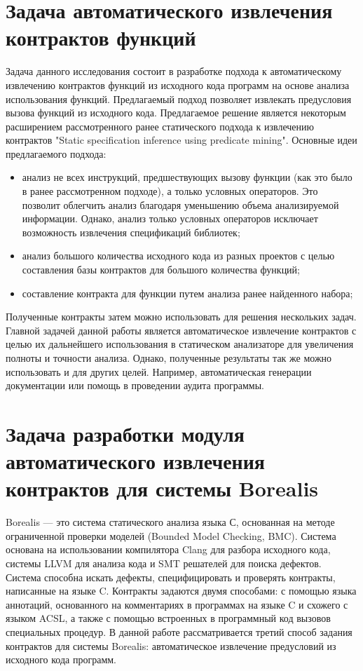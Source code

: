 \section{Задача автоматического извлечения контрактов функций}
Задача данного исследования состоит в разработке подхода к автоматическому извлечению контрактов функций из исходного кода программ на основе анализа использования функций. Предлагаемый подход позволяет извлекать предусловия вызова функций из исходного кода. Предлагаемое решение является некоторым расширением рассмотренного ранее статического подхода к извлечению контрактов "Static specification inference using predicate mining"\cite{staticPredicateMining}. Основные идеи предлагаемого подхода:
\begin{itemize}
\item анализ не всех инструкций, предшествующих вызову функции (как это было в ранее рассмотренном подходе), а только условных операторов. Это позволит облегчить анализ благодаря уменьшению объема анализируемой информации. Однако, анализ только условных операторов исключает возможность извлечения спецификаций библиотек;
\item анализ большого количества исходного кода из разных проектов с целью составления базы контрактов для большого количества функций;
\item составление контракта для функции путем анализа ранее найденного набора;
\end{itemize}

Полученные контракты затем можно использовать для решения нескольких задач. Главной задачей данной работы является автоматическое извлечение контрактов с целью их дальнейшего использования в статическом анализаторе для увеличения полноты и точности анализа. Однако, полученные результаты так же можно использовать и для других целей. Например, автоматическая генерации документации или помощь в проведении аудита программы.

\section{Задача разработки модуля автоматического извлечения контрактов для системы Borealis}
Borealis --- это система статического анализа языка С, основанная на методе ограниченной проверки моделей (Bounded Model Checking, BMC)\cite{bmc}. Система основана на использовании компилятора Clang\cite{clang} для разбора исходного кода, системы LLVM\cite{llvm} для анализа кода и SMT решателей для поиска дефектов. Система способна искать дефекты, специфицировать и проверять контракты, написанные на языке C. Контракты задаются двумя способами: с помощью языка аннотаций, основанного на комментариях в программах на языке C и схожего с языком ACSL, а также с помощью встроенных в программный код вызовов специальных процедур. В данной работе рассматривается третий способ задания контрактов для системы Borealis: автоматическое извлечение предусловий из исходного кода программ.

